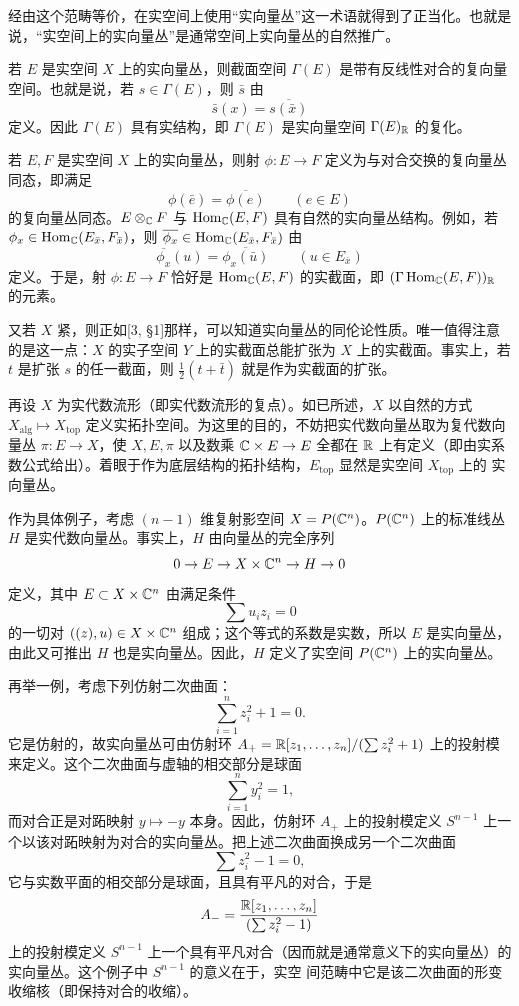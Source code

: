 经由这个范畴等价，在实空间上使用“实向量丛”这一术语就得到了正当化。也就是说，“实空间上的实向量丛”是通常空间上实向量丛的自然推广。

若 $E$ 是实空间 $X$ 上的实向量丛，则截面空间 $\Gamma(E)$ 是带有反线性对合的复向量空间。也就是说，若 $s\in\Gamma(E)$，则 $\bar s$ 由
\[
\bar s(x)=\overline{s(\bar x)}
\]
定义。因此 $\Gamma(E)$ 具有实结构，即 $\Gamma(E)$ 是实向量空间 $\Gamma(E)_{\mathbb{R}}$ 的复化。

若 $E, F$ 是实空间 $X$ 上的实向量丛，则射 $\phi\colon E\to F$ 定义为与对合交换的复向量丛同态，即满足
\[
\phi(\bar e)=\overline{\phi(e)}\qquad(e\in E)
\]
的复向量丛同态。$E\otimes_{\mathbb{C}} F$ 与 $\operatorname{Hom}_{\mathbb{C}}(E,F)$ 具有自然的实向量丛结构。例如，若 $\phi_x\in\operatorname{Hom}_{\mathbb{C}}(E_{\bar x},F_{\bar x})$，则 $\overline{\phi_x}\in\operatorname{Hom}_{\mathbb{C}}(E_{\bar x},F_{\bar x})$ 由
\[
\overline{\phi_x}(u)=\overline{\phi_x(\bar u)}\qquad(u\in E_{\bar x})
\]
定义。于是，射 $\phi\colon E\to F$ 恰好是 $\operatorname{Hom}_{\mathbb{C}}(E,F)$ 的实截面，即 $(\Gamma\operatorname{Hom}_{\mathbb{C}}(E,F))_{\mathbb{R}}$ 的元素。


又若 $X$ 紧，则正如[3, §1]那样，可以知道实向量丛的同伦论性质。唯一值得注意的是这一点：$X$ 的实子空间 $Y$ 上的实截面总能扩张为 $X$ 上的实截面。事实上，若 $t$ 是扩张 $s$ 的任一截面，则 $\frac12(t+\bar t)$ 就是作为实截面的扩张。

再设 $X$ 为实代数流形（即实代数流形的复点）。如已所述，$X$ 以自然的方式 $X_{\mathrm{alg}}\mapsto X_{\mathrm{top}}$ 定义实拓扑空间。为这里的目的，不妨把实代数向量丛取为复代数向量丛 $\pi\colon E\to X$，使 $X, E, \pi$ 以及数乘 $\mathbb{C}\times E\to E$ 全都在 $\mathbb{R}$ 上有定义（即由实系数公式给出）。着眼于作为底层结构的拓扑结构，$E_{\mathrm{top}}$ 显然是实空间 $X_{\mathrm{top}}$ 上的
实向量丛。

作为具体例子，考虑 $(n-1)$ 维复射影空间 $X=P(\mathbb{C}^n)$。$P(\mathbb{C}^n)$ 上的标准线丛 $H$ 是实代数向量丛。事实上，$H$ 由向量丛的完全序列
\[
0\to E\to X\times\mathbb{C}^n\to H\to0
\]
定义，其中 $E\subset X\times\mathbb{C}^n$ 由满足条件
\[
\sum u_iz_i=0
\]
的一切对 $((z),u)\in X\times\mathbb{C}^n$ 组成；这个等式的系数是实数，所以 $E$ 是实向量丛，由此又可推出 $H$ 也是实向量丛。因此，$H$ 定义了实空间 $P(\mathbb{C}^n)$ 上的实向量丛。

再举一例，考虑下列仿射二次曲面：
\[
\sum_{i=1}^n z_i^2+1=0.
\]
它是仿射的，故实向量丛可由仿射环 $A_+=\mathbb{R}[z_1,\dots,z_n]/(\sum z_i^2+1)$ 上的投射模来定义。这个二次曲面与虚轴的相交部分是球面
\[
\sum_{i=1}^n y_i^2=1,
\]
而对合正是对跖映射 $y\mapsto-y$ 本身。因此，仿射环 $A_+$ 上的投射模定义 $S^{n-1}$ 上一个以该对跖映射为对合的实向量丛。把上述二次曲面换成另一个二次曲面
\[
\sum z_i^2-1=0,
\]
它与实数平面的相交部分是球面，且具有平凡的对合，于是
\[
A_-=\frac{\mathbb{R}[z_1,\dots,z_n]}{(\sum z_i^2-1)}
\]
上的投射模定义 $S^{n-1}$ 上一个具有平凡对合（因而就是通常意义下的实向量丛）的实向量丛。这个例子中 $S^{n-1}$ 的意义在于，实空
间范畴中它是该二次曲面的形变收缩核（即保持对合的收缩）。

